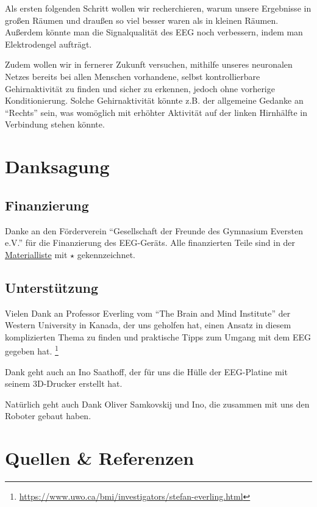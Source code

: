 \documentclass[11pt]{scrartcl}
\begin{document}
	Als ersten folgenden Schritt wollen wir recherchieren, warum unsere Ergebnisse in großen Räumen und draußen so viel besser waren als in kleinen Räumen. Außerdem könnte man die Signalqualität des EEG noch verbessern, indem man Elektrodengel aufträgt. 

	Zudem wollen wir in fernerer Zukunft versuchen, mithilfe unseres neuronalen Netzes bereits bei allen Menschen vorhandene, selbst kontrollierbare Gehirnaktivität zu finden und sicher zu erkennen, jedoch ohne vorherige Konditionierung. Solche Gehirnaktivität könnte z.B. der allgemeine Gedanke an \enquote{Rechts} sein, was womöglich mit erhöhter Aktivität auf der linken Hirnhälfte in Verbindung stehen könnte.
	
	\newpage

	\section{Danksagung}

	\subsection{Finanzierung} \label{Foerderverein}

	Danke an den Förderverein \enquote{Gesellschaft der Freunde des Gymnasium Eversten e.V.} für die Finanzierung des EEG-Geräts. Alle finanzierten Teile sind in der \hyperref[Materialien]{Materialliste} mit $\star$ gekennzeichnet. 

	\subsection{Unterstützung} \label{Unterstuetzung}

	Vielen Dank an Professor Everling vom \enquote{The Brain and Mind Institute} der Western University in Kanada, der uns geholfen hat, einen Ansatz in diesem komplizierten Thema zu finden und praktische Tipps zum Umgang mit dem EEG gegeben hat. \footnote{\href{https://www.uwo.ca/bmi/investigators/stefan-everling.html}{https://www.uwo.ca/bmi/investigators/stefan-everling.html}}

	Dank geht auch an Ino Saathoff, der für uns die Hülle der EEG-Platine mit seinem 3D-Drucker erstellt hat.

	Natürlich geht auch Dank Oliver Samkovskij und Ino, die zusammen mit uns den Roboter gebaut haben.

	\section{Quellen \& Referenzen}
\end{document}
